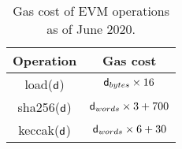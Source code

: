 \begin{table}
\centering
\begin{tabular}{|c|c|}
\hline
\textbf{Operation} & \textbf{Gas cost} \\ \hline
\textsf{load}($\mathsf{d}$)            & $ \mathsf{d}_{bytes} \times 16 $          \\ \hline
\textsf{sha256}($\mathsf{d}$)          & $\mathsf{d}_{words} \times 3 + 700 $     \\ \hline
\textsf{keccak}($\mathsf{d}$)          & $\mathsf{d}_{words} \times 6 + 30 $      \\ \hline
\end{tabular}
\caption{Gas cost of EVM operations as of June 2020.}
\label{tab:operations-gas}
\end{table}
